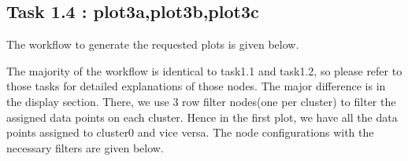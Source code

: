 \documentclass[11pt]{article}
\begin{document}
		 \subsection*{Task 1.4 : plot3a,plot3b,plot3c}
			The workflow to generate the requested plots is given below.

			The majority of the workflow is identical to task1.1 and task1.2, so please refer to those tasks for detailed explanations of those nodes. The major difference is in the display section. There, we use 3 row filter nodes(one per cluster) to filter the assigned data points on each cluster. Hence in the first plot, we have all the data points assigned to cluster0 and vice versa. The node configurations with the necessary filters are given below.
			\iffalse
\end{document}
